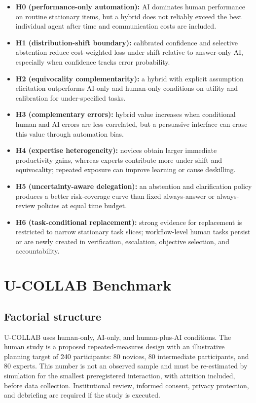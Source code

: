 \documentclass[conference]{IEEEtran}
\begin{document}
\begin{itemize}
\item \textbf{H0 (performance-only automation):} AI dominates human performance on routine stationary items, but a hybrid does not reliably exceed the best individual agent after time and communication costs are included.
\item \textbf{H1 (distribution-shift boundary):} calibrated confidence and selective abstention reduce cost-weighted loss under shift relative to answer-only AI, especially when confidence tracks error probability.
\item \textbf{H2 (equivocality complementarity):} a hybrid with explicit assumption elicitation outperforms AI-only and human-only conditions on utility and calibration for under-specified tasks.
\item \textbf{H3 (complementary errors):} hybrid value increases when conditional human and AI errors are less correlated, but a persuasive interface can erase this value through automation bias.
\item \textbf{H4 (expertise heterogeneity):} novices obtain larger immediate productivity gains, whereas experts contribute more under shift and equivocality; repeated exposure can improve learning or cause deskilling.
\item \textbf{H5 (uncertainty-aware delegation):} an abstention and clarification policy produces a better risk-coverage curve than fixed always-answer or always-review policies at equal time budget.
\item \textbf{H6 (task-conditional replacement):} strong evidence for replacement is restricted to narrow stationary task slices; workflow-level human tasks persist or are newly created in verification, escalation, objective selection, and accountability.
\end{itemize}

\section{U-COLLAB Benchmark}

\subsection{Factorial structure}

U-COLLAB uses human-only, AI-only, and human-plus-AI conditions. The human study is a proposed repeated-measures design with an illustrative planning target of 240 participants: 80 novices, 80 intermediate participants, and 80 experts. This number is not an observed sample and must be re-estimated by simulation for the smallest preregistered interaction, with attrition included, before data collection. Institutional review, informed consent, privacy protection, and debriefing are required if the study is executed.
\end{document}
